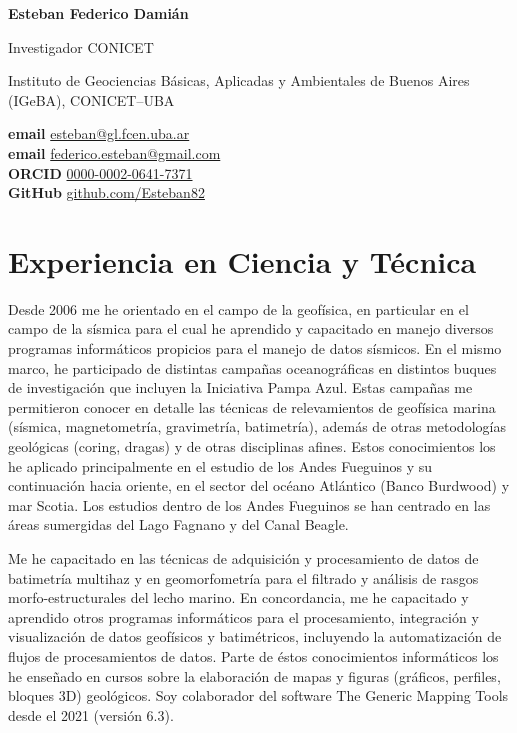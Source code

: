 \documentclass[11pt, a4paper]{article}
\makeatletter
\newcommand{\fullname}{Esteban Federico Damián}
\newcommand{\email}{esteban@gl.fcen.uba.ar}
\newcommand{\emailalt}{federico.esteban@gmail.com}
\newcommand{\github}{Esteban82}
\newcommand{\orcid}{0000-0002-0641-7371}
\newcommand{\maintitle}[1]{%
    \begin{flushleft}
        \textbf{\Huge #1}
    \end{flushleft}
}
\newcommand{\subtitle}[1]{%
    \begin{flushleft}
        {\LARGE #1}
    \end{flushleft}
}
\newcommand{\affiliation}[1]{%
    \begin{flushleft}
        {\large #1}
    \end{flushleft}
}
\newcommand{\MAIL}[1]{\href{mailto:#1}{#1}}
\newcommand{\GITHUB}[1]{\href{https://github.com/#1}{github.com/#1}}
\newcommand{\ORCID}[1]{\href{https://orcid.org/#1}{#1}}
\newcommand{\isodate}{\number\year-\ifnum\month<10 0\fi\number\month-\ifnum\day<10 0\fi\number\day}
\makeatother
\begin{document}
\maintitle{\fullname}

\begin{minipage}[t]{0.58\linewidth}
    \begin{flushleft}
        \subtitle{Investigador CONICET}
        \affiliation{Instituto de Geociencias Básicas, Aplicadas y Ambientales de Buenos Aires (IGeBA), CONICET--UBA}
    \end{flushleft}
\end{minipage}
\hfill
\begin{minipage}[t]{0.40\linewidth}
    \begin{flushright}
        \textbf{email} \MAIL{\email}
        \\
        \textbf{email} \MAIL{\emailalt}
        \\
        \textbf{ORCID} \ORCID{\orcid}
        \\
        \textbf{GitHub} \GITHUB{\github}
        \\
        \color{mygray}{Última modificación: \isodate}
    \end{flushright}
\end{minipage}


\section{Experiencia en Ciencia y Técnica}

Desde 2006 me he orientado en el campo de la geofísica, en particular en el campo de la sísmica para el cual he aprendido y capacitado en manejo diversos programas informáticos propicios para el manejo de datos sísmicos. En el mismo marco, he participado de distintas campañas oceanográficas en distintos buques de investigación que incluyen la Iniciativa Pampa Azul. Estas campañas me permitieron conocer en detalle las técnicas de relevamientos de geofísica marina (sísmica, magnetometría, gravimetría, batimetría), además de otras metodologías geológicas (coring, dragas) y de otras disciplinas afines. Estos conocimientos los he aplicado principalmente en el estudio de los Andes Fueguinos y su continuación hacia oriente, en el sector del océano Atlántico (Banco Burdwood) y mar Scotia. Los estudios dentro de los Andes Fueguinos se han centrado en las áreas sumergidas del Lago Fagnano y del Canal Beagle.

Me he capacitado en las técnicas de adquisición y procesamiento de datos de batimetría multihaz y en geomorfometría para el filtrado y análisis de rasgos morfo-estructurales del lecho marino. En concordancia, me he capacitado y aprendido otros programas informáticos para el procesamiento, integración y visualización de datos geofísicos y batimétricos, incluyendo la automatización de flujos de procesamientos de datos. Parte de éstos conocimientos informáticos los he enseñado en cursos sobre la elaboración de mapas y figuras (gráficos, perfiles, bloques 3D) geológicos. Soy colaborador del software The Generic Mapping Tools desde el 2021 (versión 6.3).
\end{document}
